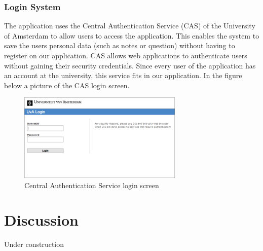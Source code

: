 \documentclass[11pt]{article}
\begin{document}
\subsubsection{Login System}
The application uses the Central Authentication Service (CAS) of the University of Amsterdam to allow users to access the application. This enables the system to save the users personal data (such as notes or question) without having to register on our application. CAS allows web applications to authenticate users without gaining their security credentials. Since every user of the application has an account at the university, this service fits in our application. In the figure below a picture of the CAS login screen.
\begin{figure}[!h]
\centering
\includegraphics[width=0.7\textwidth]{Cas.png}
\caption{Central Authentication Service login screen}
\end{figure}

\section{Discussion}
Under construction
\end{document}
